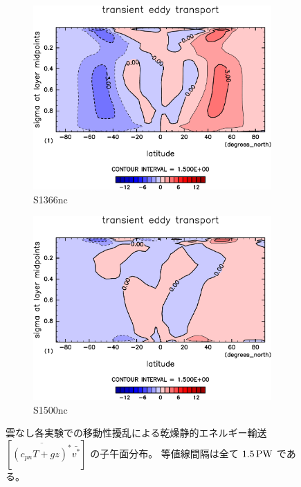 \documentclass[body]{subfiles}
\begin{document}
\begin{figure}[t]
	\centering
	\begin{subfigure}{.4\textwidth}
		\centering
		\includegraphics[width=\textwidth]{S1366-nc/MeriHeatTransTest@dryStatEn_TE,time=3650:4015-crop-rotate.pdf}
		\caption{S1366nc}\label{乾燥静的エネルギー移動性擾乱S1366nc}
	\end{subfigure}
	\begin{subfigure}{.4\textwidth}
		\centering
		\includegraphics[width=\textwidth]{S1500-nc/MeriHeatTransTest@dryStatEn_TE,time=3650:4015-crop-rotate.pdf}
		\caption{S1500nc}\label{乾燥静的エネルギー移動性擾乱S1500nc}
	\end{subfigure}
	\caption[雲なし各実験での移動性擾乱に依る乾燥静的エネルギー輸送の子午面分布]{
		雲なし各実験での移動性擾乱による乾燥静的エネルギー輸送\([\overline{(c_{pn}T+gz)^*}\bar{v^*}]\) の子午面分布。
		等値線間隔は全て \(1.5\hmu{PW}\) である。
	}\label{乾燥静的エネルギー移動性擾乱nc}
\end{figure}
\end{document}
